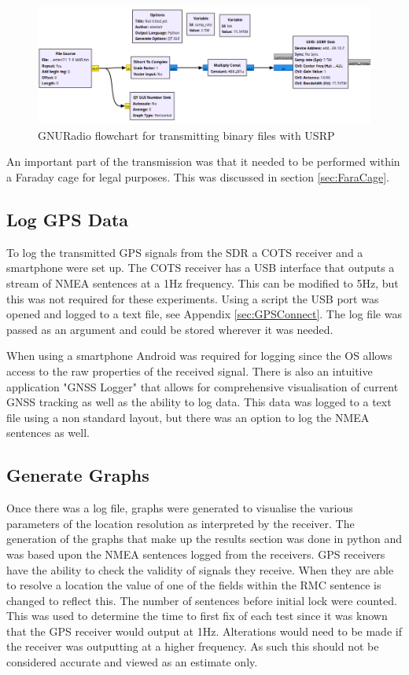 \begin{figure}[!ht]
    \begin{centering}
        \includegraphics[width=14cm,keepaspectratio]{Figures/GNURadio_Spoofer.png}
        \caption{GNURadio flowchart for transmitting binary files with USRP}
    \label{fig:GNURadioSpoof}
    \end{centering}
\end{figure}

An important part of the transmission was that it needed to be performed within a Faraday cage for legal purposes. This was discussed in section \ref{sec:FaraCage}.

\subsection{Log GPS Data}
To log the transmitted GPS signals from the SDR a COTS receiver and a smartphone were set up. The COTS receiver has a USB interface that outputs a stream of NMEA
sentences at a 1Hz frequency. This can be modified to 5Hz, but this was not required for these experiments. Using a script the USB port was opened and logged to a text
file, see Appendix \ref{sec:GPSConnect}. The log file was passed as an argument and could be stored wherever it was needed. 

When using a smartphone Android was required for logging since the OS allows access to the raw properties of the received signal. There is also an intuitive application
"GNSS Logger" that allows for comprehensive visualisation of current GNSS tracking as well as the ability to log data. This data was logged to a text file using a non
standard layout, but there was an option to log the NMEA sentences as well.  

\subsection{Generate Graphs}
Once there was a log file, graphs were generated to visualise the various parameters of the location resolution as interpreted by the receiver. 
The generation of the graphs that make up the results section was done in python and was based upon the NMEA sentences logged from the receivers. GPS receivers have the
ability to check the validity of signals they receive. When they are able to resolve a location the value of one of the fields within the RMC sentence is changed to
reflect this. The number of sentences before initial lock were counted. This was
used to determine the time to first fix of each test since it was known that the GPS receiver would output at 1Hz. Alterations would need to be made if the receiver was
outputting at a higher frequency. As such this should not be considered accurate and viewed as an estimate only.

